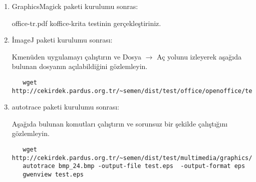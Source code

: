 \documentclass[a4paper,10pt]{article}
\begin{document}
\begin{enumerate}
Yerel dili değiştirmek için:

İlgili gimp dil paketi ile glibc-locales-<lang> paketini kurun. Örneğin: gimp-i18n-es için için glibc-locales-es.

\begin{verbatim}
export LC_ALL=<lang_LANG>
\end{verbatim}

lang\_LANG şeklinde yazılmış olan, pt-BT için pt\_BT, diğer diller için örneğin de\_DE olacaktır.

Daha sonra bu çalıştırdığınız komut dizininde gimp komutunu çalıştırın, uygulamanın sorunsuz bir şekilde istenilen dilde açıldığını gözlemleyin.
\begin{verbatim}
gimp-i18n-es
gimp-i18n-sk
gimp-i18n-sl
gimp-i18n-sr
gimp-i18n-sr_Latn
gimp-i18n-sv
gimp-i18n-ta
gimp-i18n-th
gimp-i18n-tt
gimp-i18n-uk
gimp-i18n-vi
gimp-i18n-et
gimp-i18n-eu
gimp-i18n-fa
gimp-i18n-fi
gimp-i18n-fr
gimp-i18n-ga
gimp-i18n-gl
gimp-i18n-gu
gimp-i18n-he
gimp-i18n-hi
gimp-i18n-xh
gimp-i18n-yi
gimp-i18n-zh_CN
gimp-i18n-zh_HK
gimp-i18n-zh_TW
gimp-i18n-hr
gimp-i18n-hu
gimp-i18n-id
gimp-i18n-is
gimp-i18n-it
gimp-i18n-ja
gimp-i18n-ka
gimp-i18n-km
gimp-i18n-kn
gimp-i18n-ko
gimp-i18n-lt
gimp-i18n-lv
gimp-i18n-mk
gimp-i18n-ml
gimp-i18n-mr
gimp-i18n-ms
gimp-i18n-nb
gimp-i18n-ne
gimp-i18n-nl
gimp-i18n-nn
gimp-i18n-oc
gimp-i18n-or
gimp-i18n-pa
gimp-i18n-pl
gimp-i18n-pt
gimp-i18n-pt_BR
gimp-i18n-ro
gimp-i18n-ru
gimp-i18n-rw
gimp-i18n-si 
\end{verbatim}

 \item GraphicsMagick  paketi kurulumu sonras:

office-tr.pdf koffice-krita testinin gerçekleştiriniz.

 \item İmageJ paketi kurulumu sonrası:

 Kmenüden uygulamayı çalıştırın ve Dosya $\rightarrow$ Aç yolunu izleyerek aşağıda bulunan dosyanın açılabildiğini gözlemleyin.
  \begin{verbatim}
   wget http://cekirdek.pardus.org.tr/~semen/dist/test/office/openoffice/test_oodraw.jpg
  \end{verbatim}

\item autotrace paketi kurulumu sonrası:

Aşağıda bulunan komutları çalıştırın ve sorunsuz bir şekilde çalıştığını gözlemleyin.
  \begin{verbatim}
   wget http://cekirdek.pardus.org.tr/~semen/dist/test/multimedia/graphics/bmp_24.bmp
   autotrace bmp_24.bmp -output-file test.eps  -output-format eps
   gwenview test.eps 
  \end{verbatim}


\end{enumerate}
\end{document}

